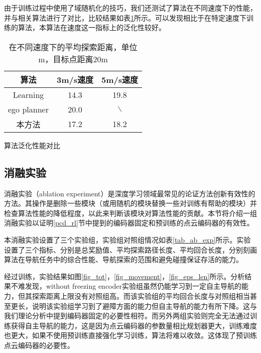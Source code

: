 由于训练过程中使用了域随机化的技巧，我们还测试了算法在不同速度下的性能，并与相关算法进行了对比，比较结果如表\ref{tab_generalize}所示。可以发现相比于在特定速度下训练的算法，本算法在速度这一指标上的泛化性较好。

\begin{table}
    \centering
    \begin{tabular}{ccc}
    \hline
        算法 & 3m/s速度 & 5m/s速度 \\ \hline
        Learning\cite{loquercio2021learning} & 14.3 & 19.8 \\ 
        ego planner\cite{zhou2020ego} & 20.0 & $\backslash$ \\ 
        本方法 & 17.2 & 18.2 \\ \hline
    \end{tabular}
    \caption{算法泛化性能对比}
    \caption*{在不同速度下的平均探索距离，单位m，目标点距离20m}
    \label{tab_generalize}
\end{table}

\subsection{消融实验}

消融实验（ablation experiment）是深度学习领域最常见的论证方法创新有效性的方法。其操作是删除一些模块（或用随机的模块替换一些对训练有帮助的模块）并检查算法性能的降低程度，以此来判断该模块对算法性能的贡献。本节将介绍一组消融实验以证明\ref{pcd_rl}节中提到的编码器固定和预训练的点云编码器的有效性。

本消融实验设置了三个实验组，实验组对照组情况如表\ref{tab_ab_exp}所示。实验设置了三个指标、分别是总奖励值、平均探索路径长度、平均回合长度，分别刻画算法在导航任务中的综合性能、导航探索的范围和避免碰撞保证存活的能力。

经过训练，实验结果如图\ref{fig_tot}，\ref{fig_movement}，\ref{fig_eps_len}所示。分析结果不难发现，without freezing encoder实验组虽然仍能学习到一定自主导航的能力，但其探索距离上限没有对照组高。而该实验组的平均回合长度与对照组相当甚至更长，说明该实验组学习到了避障方面的能力但自主导航的能力有所下降。这与我们理论分析中提到编码器固定的必要性相符。而另外两组实验则完全无法通过训练获得自主导航的能力，这是因为点云编码器的参数量相比规划器更大，训练难度也更大，如果不使用预训练直接强化学习训练，算法将难以收敛。这体现了预训练点云编码器的必要性。

